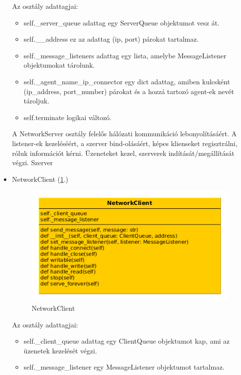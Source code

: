 \documentclass[a4paper,12pt,oneside]{report}
\begin{document}
\begin{itemize}
            Az osztály adattagjai:
            \begin{itemize}
                \itemsep0em
                    \item self.\_server\_queue adattag egy ServerQueue objektumot vesz át.
                    \item self.\_\_address ez az adattag (ip, port) párokat tartalmaz.
                    \item self.\_message\_listeners adattag egy lista, amelybe MessageListener objektumokat tárolunk.
                    \item self.\_agent\_name\_ip\_connector egy dict adattag, amiben kulcsként (ip\_address, port\_number) párokat és a hozzá tartozó agent-ek nevét tároljuk.
                    \item self.terminate logikai változó.
            \end{itemize}
            
            A NetworkServer osztály felelős hálózati kommunikáció lebonyolításáért.
            A listener-ek kezeléséért, a szerver bind-olásáért, képes klienseket regisztrálni, róluk információt kérni.
            Üzeneteket kezel, szerverek indítását/megállítását végzi.
            Szerver

        \item NetworkClient (\ref{fig:networkclient}.)
            \begin{figure}[h]
              \includegraphics[width=13cm,keepaspectratio]{networkclient.png}
              \caption{NetworkClient}
              \label{fig:networkclient}
            \end{figure}
            
            Az osztály adattagjai:
            \begin{itemize}
                \itemsep0em
                    \item self.\_client\_queue adattag egy ClientQueue objektumot kap, ami az üzenetek kezelését végzi.
                    \item self.\_message\_listener egy MessageListener objektumot tartalmaz.
            \end{itemize}
            

\end{itemize}
\end{document}
